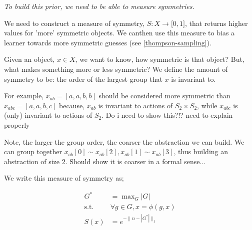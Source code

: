\begin{displayquote}
	\textsl{To build this prior, we need to be able to measure symmetries.}
\end{displayquote}

We need to construct a measure of symmetry, $S: X \to \mathbb [0, 1]$, that returns higher values for 'more' symmetric objects.
We canthen use this measure to bias a learner towards more symmetric guesses (see \ref{thompson-sampling}).

Given an object, $x \in X$, we want to know, how symmetric is that object?
But, what makes something more or less symmetric?
We define the amount of symmetry to be: the order \footnotemark[42] of the largest group that $x$ is invariant to.


For example, $x_{ab} = [a,a,b,b]$ should be considered more symmetric than $x_{abc} = [a,a,b,c]$ because,
$x_{ab}$ is invariant to actions of $S_2 \times S_2$, while $x_{abc}$ is (only) invariant to actions of $S_2$.
{\color{red}Do i need to show this?!? need to explain properly}

Note, the larger the group order, the coarser the abstraction we can build. We can group together $x_{ab}[0] \sim x_{ab}[2], x_{ab}[1] \sim x_{ab}[3]$, thus building an abstraction of size $2$.
{\color{red}Should show it is coarser in a formal sense...}



We write this measure of symmetry as;

\begin{align*}
G^{* } &= \mathop{\text{max}}_G |G| \tag{pick the largest group}\\
\text{s.t.} \;\; &\forall g\in G, x = \phi(g, x) \tag{that $x$ is invariant to} \\
S(x) &= e^{-\parallel n-|G^{* }| \parallel_1} \tag{transform so $S(x)\in [0, 1]$}
\end{align*}

